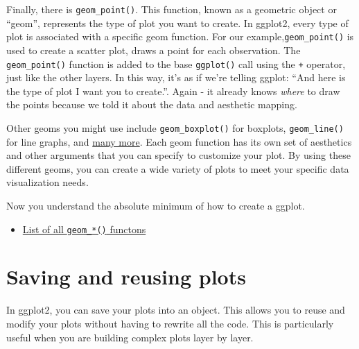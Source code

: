 \documentclass[
  letterpaper,
  DIV=11,
  numbers=noendperiod]{scrartcl}
\providecommand{\tightlist}{%
  \setlength{\itemsep}{0pt}\setlength{\parskip}{0pt}}\usepackage{longtable,booktabs,array}
\begin{document}
Finally, there is \texttt{geom\_point()}. This function, known as a
geometric object or ``geom'', represents the type of plot you want to
create. In ggplot2, every type of plot is associated with a specific
geom function. For our example,\texttt{geom\_point()} is used to create
a scatter plot, draws a point for each observation. The
\texttt{geom\_point()} function is added to the base \texttt{ggplot()}
call using the \texttt{+} operator, just like the other layers. In this
way, it's as if we're telling ggplot: ``And here is the type of plot I
want you to create.''. Again - it already knows \emph{where} to draw the
points because we told it about the data and aesthetic mapping.

Other geoms you might use include \texttt{geom\_boxplot()} for boxplots,
\texttt{geom\_line()} for line graphs, and
\href{https://ggplot2.tidyverse.org/reference/\#geoms}{many more}. Each
geom function has its own set of aesthetics and other arguments that you
can specify to customize your plot. By using these different geoms, you
can create a wide variety of plots to meet your specific data
visualization needs.

Now you understand the absolute minimum of how to create a ggplot.

\begin{tcolorbox}[enhanced jigsaw, left=2mm, title=\textcolor{quarto-callout-tip-color}{\faLightbulb}\hspace{0.5em}{Additional Resources}, toprule=.15mm, colback=white, coltitle=black, opacityback=0, breakable, titlerule=0mm, bottomtitle=1mm, toptitle=1mm, colbacktitle=quarto-callout-tip-color!10!white, arc=.35mm, rightrule=.15mm, bottomrule=.15mm, leftrule=.75mm, colframe=quarto-callout-tip-color-frame, opacitybacktitle=0.6]

\begin{itemize}
\tightlist
\item
  \href{https://ggplot2.tidyverse.org/reference/\#geoms}{List of all
  \texttt{geom\_*()} functons}
\end{itemize}

\end{tcolorbox}

\hypertarget{saving-and-reusing-plots}{%
\section{Saving and reusing plots}\label{saving-and-reusing-plots}}

In ggplot2, you can save your plots into an object. This allows you to
reuse and modify your plots without having to rewrite all the code. This
is particularly useful when you are building complex plots layer by
layer.
\end{document}
